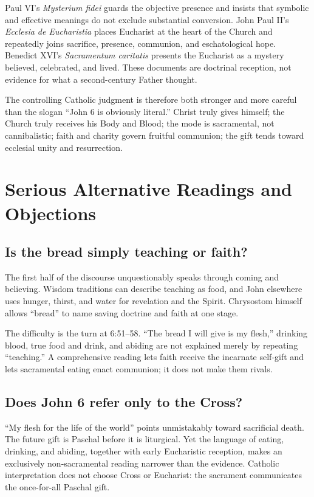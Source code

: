 \begin{deepstudy}
Paul VI's \emph{Mysterium fidei} guards the objective presence and insists that
symbolic and effective meanings do not exclude substantial conversion. John
Paul II's \emph{Ecclesia de Eucharistia} places Eucharist at the heart of the
Church and repeatedly joins sacrifice, presence, communion, and eschatological
hope. Benedict XVI's \emph{Sacramentum caritatis} presents the Eucharist as a
mystery believed, celebrated, and lived. These documents are doctrinal
reception, not evidence for what a second-century Father thought.

The controlling Catholic judgment is therefore both stronger and more careful
than the slogan ``John 6 is obviously literal.'' Christ truly gives himself;
the Church truly receives his Body and Blood; the mode is sacramental, not
cannibalistic; faith and charity govern fruitful communion; the gift tends
toward ecclesial unity and resurrection.

\section{Serious Alternative Readings and Objections}

\subsection{Is the bread simply teaching or faith?}

The first half of the discourse unquestionably speaks through coming and
believing. Wisdom traditions can describe teaching as food, and John elsewhere
uses hunger, thirst, and water for revelation and the Spirit. Chrysostom himself
allows ``bread'' to name saving doctrine and faith at one stage.

The difficulty is the turn at 6:51--58. ``The bread I will give is my flesh,''
drinking blood, true food and drink, and abiding are not explained merely by
repeating ``teaching.'' A comprehensive reading lets faith receive the incarnate
self-gift and lets sacramental eating enact communion; it does not make them
rivals.

\subsection{Does John 6 refer only to the Cross?}

``My flesh for the life of the world'' points unmistakably toward sacrificial
death. The future gift is Paschal before it is liturgical. Yet the language of
eating, drinking, and abiding, together with early Eucharistic reception, makes
an exclusively non-sacramental reading narrower than the evidence. Catholic
interpretation does not choose Cross or Eucharist: the sacrament communicates
the once-for-all Paschal gift.


\end{deepstudy}
